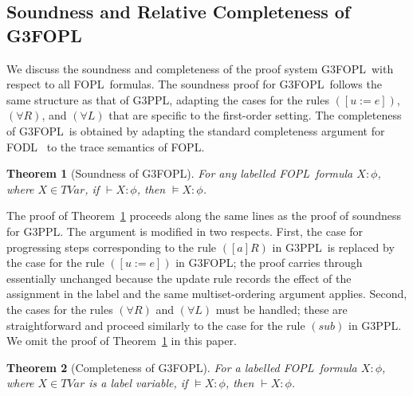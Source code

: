 \documentclass[manuscript,screen]{acmart}
\newtheorem{theorem}{Theorem}[section]
\newcommand{\Sub}[0]{{\textit{sub}}}
\newcommand{\GiiiPPLcyc}[0]{\mbox{G3PPL}}
\newcommand{\GiiiFOPLcyc}[0]{\mbox{G3FOPL}}
\newcommand{\TVar}[0]{\textit{TVar}}
\newcommand{\FOPL}[0]{\mbox{FOPL}}
\newcommand{\FODL}[0]{\mbox{FODL}}
\begin{document}
\subsection{Soundness and Relative Completeness of \GiiiFOPLcyc}
\label{section:Soundness and Completeness of GiiiFOPLcyc}

We discuss the soundness and completeness of the proof system \GiiiFOPLcyc\ with respect to all \FOPL\ formulas. 
The soundness proof for \GiiiFOPLcyc\ follows the same structure as that of \GiiiPPLcyc, adapting the cases for the rules $([u:=e])$, $(\forall R)$, and $(\forall L)$ that are specific to the first-order setting.  The completeness of \GiiiFOPLcyc\ is obtained by adapting the standard completeness argument for \FODL~\cite{Harel00} to the trace semantics of \FOPL. 


\begin{theorem}[Soundness of \GiiiFOPLcyc]
    \label{theorem:Soundness of GiiiFOPLcyc}
    For any labelled \FOPL\ formula $X :\phi$, where $X\in \TVar$, if $\vdash X : \phi$, then $\models X : \phi$.
\end{theorem}

The proof of Theorem~\ref{theorem:Soundness of GiiiFOPLcyc} proceeds along the same lines as the proof of soundness for \GiiiPPLcyc. The argument is modified in two respects. First, the case for progressing steps corresponding to the rule $([a]R)$ in \GiiiPPLcyc\ is replaced by the case for the rule $([u:=e])$ in \GiiiFOPLcyc; the proof carries through essentially unchanged because the update rule records the effect of the assignment in the label and the same multiset-ordering argument applies. Second, the cases for the rules $(\forall R)$ and $(\forall L)$ must be handled; these are straightforward and proceed similarly to the case for the rule $(\Sub)$ in \GiiiPPLcyc. 
We omit the proof of Theorem~\ref{theorem:Soundness of GiiiFOPLcyc} in this paper. 


 \begin{theorem}[Completeness of \GiiiFOPLcyc]
\label{theorem:Completeness of GiiiFOPLcyc}
    For a labelled \FOPL\ formula $X : \phi$, where $X\in \TVar$ is a label variable, if $\models X : \phi$, then $\vdash X : \phi$. 
\end{theorem}
\end{document}
